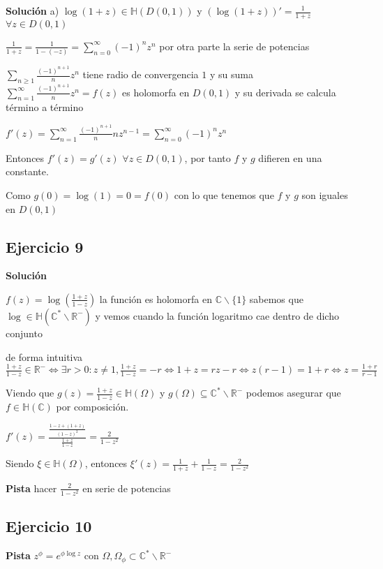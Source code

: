 \textbf{Solución}
a)
$\log (1+z) \in\mathbb{H}(D(0,1))$ y $(\log (1+z))' = \frac{1}{1+z}$ $\forall z\in D(0,1)$

$\frac{1}{1+z} = \frac{1}{1-(-z)} = \sum_{n=0}^{\infty} (-1)^n z^n$
por otra parte la serie de potencias 

$\sum_{n\geq 1} \frac{(-1)^{n+1}}{n} z^n$ tiene radio de convergencia $1$
y su suma $\sum_{n=1}^{\infty} \frac{(-1)^{n+1}}{n} z^n = f(z)$ es holomorfa en $D(0,1)$ y su derivada se calcula término a término

$f'(z) = \sum_{n=1}^{\infty} \frac{(-1)^{n+1}}{n} n z^{n-1} = \sum_{n=0}^{\infty} (-1)^{n}z^{n}$

Entonces $f'(z) = g'(z)$ $\forall z\in D(0,1)$, por tanto $f$ y $g$ difieren en una constante.

Como $g(0) = \log(1) = 0 = f(0)$
con lo que tenemos que $f$ y $g$ son iguales en $D(0,1)$



\subsection{Ejercicio 9}


\textbf{Solución}

$f(z) = \log(\frac{1+z}{1-z})$
la función es holomorfa en $\mathbb{C}\backslash \{1\}$
sabemos que $\log \in \mathbb{H}(\mathbb{C}^{\ast}\backslash\mathbb{R}^-)$
y vemos cuando la función logaritmo cae dentro de dicho conjunto

de forma intuitiva
$\frac{1+z}{1-z} \in\mathbb{R}^- \Longleftrightarrow \exists r>0 : z\not=1, \frac{1+z}{1-z} = -r \Longleftrightarrow 1+z = rz-r \Longleftrightarrow z(r-1)=1+r \Longleftrightarrow z = \frac{1+r}{r-1}$

Viendo que
$g(z) = \frac{1+z}{1-z} \in\mathbb{H}(\Omega)$ y $g(\Omega) \subseteq \mathbb{C}^{\ast}\backslash \mathbb{R}^-$
podemos asegurar que $f\in\mathbb{H}(\mathbb{C})$ por composición.

$f'(z) = \frac{ \frac{1-z+(1+z)}{(1-z)^2} }{ \frac{1+z}{1-z} } = \frac{2}{1-z^2}$

Siendo $\xi\in\mathbb{H}(\Omega)$, entonces
$\xi '(z) = \frac{1}{1+z} + \frac{1}{1-z} = \frac{2}{1-z^2}$



\textbf{Pista}
hacer $\frac{2}{1-z^2}$ en serie de potencias





\subsection{Ejercicio 10}
\textbf{Pista}
$z^{\phi} = e^{ \phi \log z}$ con $\Omega,\Omega_{\phi} \subset \mathbb{C}^{\ast}\backslash \mathbb{R^-}$

